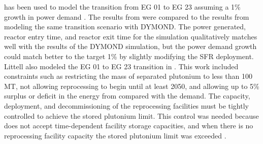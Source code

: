 \Cyclus has been used to model the transition from \gls{EG} 01 to \gls{EG} 
23 assuming a 1\% growth in power demand 
\cite{djokic_application_2015}. The results from \Cyclus were compared 
to the results from modeling the same transition scenario with \gls{DYMOND}. 
The power generated, reactor entry 
time, and reactor exit time for the \Cyclus simulation qualitatively 
matches well with the results of the \gls{DYMOND} simulation, but the power 
demand growth could match better to the target 1\% by slightly modifying 
the \gls{SFR} deployment. Littell \cite{littell_development_2016}
also modeled the \gls{EG} 01 to \gls{EG} 23 transition in \Cyclus. 
This work included constraints such as restricting the mass of separated 
plutonium to less than 100 MT, not allowing reprocessing to begin until 
at least 2050, and allowing up to 5\% surplus or deficit in the energy 
from compared with the demand. The capacity, deployment, and 
decommissioning of the reprocessing facilities must be tightly controlled
to achieve the stored plutonium limit. This control was needed 
because \Cyclus does not accept time-dependent facility storage capacities, 
and when there is no reprocessing facility capacity the stored plutonium 
limit was exceeded \cite{littell_development_2016}. 

%
%
%
